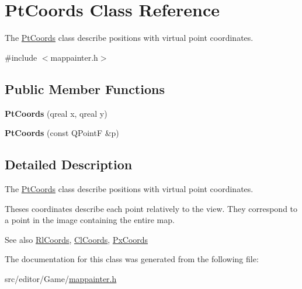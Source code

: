 \hypertarget{class_pt_coords}{\section{\-Pt\-Coords \-Class \-Reference}
\label{class_pt_coords}
}


\-The \hyperlink{class_pt_coords}{\-Pt\-Coords} class describe positions with virtual point coordinates.  




{\ttfamily \#include $<$mappainter.\-h$>$}

\subsection*{\-Public \-Member \-Functions}
\begin{DoxyCompactItemize}
\item 
\hypertarget{class_pt_coords_ad384f0c2b1e4ac127cfd2aa789810536}{{\bfseries \-Pt\-Coords} (qreal x, qreal y)}\label{class_pt_coords_ad384f0c2b1e4ac127cfd2aa789810536}

\item 
\hypertarget{class_pt_coords_a8e30f67406d22baf10a4556435562248}{{\bfseries \-Pt\-Coords} (const \-Q\-Point\-F \&p)}\label{class_pt_coords_a8e30f67406d22baf10a4556435562248}

\end{DoxyCompactItemize}


\subsection{\-Detailed \-Description}
\-The \hyperlink{class_pt_coords}{\-Pt\-Coords} class describe positions with virtual point coordinates. 

\-Theses coordinates describe each point relatively to the view. \-They correspond to a point in the image containing the entire map.

\begin{DoxySeeAlso}{\-See also}
\hyperlink{class_rl_coords}{\-Rl\-Coords}, \hyperlink{class_cl_coords}{\-Cl\-Coords}, \hyperlink{class_px_coords}{\-Px\-Coords} 
\end{DoxySeeAlso}


\-The documentation for this class was generated from the following file\-:\begin{DoxyCompactItemize}
\item 
src/editor/\-Game/\hyperlink{mappainter_8h}{mappainter.\-h}\end{DoxyCompactItemize}
